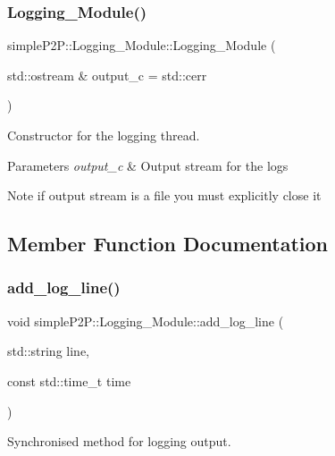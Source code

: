 \subsubsection{\texorpdfstring{Logging\+\_\+\+Module()}{Logging\_Module()}}
{\footnotesize\ttfamily simple\+P2\+P\+::\+Logging\+\_\+\+Module\+::\+Logging\+\_\+\+Module (\begin{DoxyParamCaption}\item[{std\+::ostream \&}]{output\+\_\+c = {\ttfamily std\+:\+:cerr} }\end{DoxyParamCaption})}



Constructor for the logging thread. 


\begin{DoxyParams}{Parameters}
{\em output\+\_\+c} & Output stream for the logs \\
\hline
\end{DoxyParams}
\begin{DoxyNote}{Note}
if output stream is a file you must explicitly close it 
\end{DoxyNote}


\subsection{Member Function Documentation}
\mbox{\label{classsimpleP2P_1_1Logging__Module_a5f1eb6d6c66d406f02ae4093cc7657ec}} 
\subsubsection{\texorpdfstring{add\+\_\+log\+\_\+line()}{add\_log\_line()}}
{\footnotesize\ttfamily void simple\+P2\+P\+::\+Logging\+\_\+\+Module\+::add\+\_\+log\+\_\+line (\begin{DoxyParamCaption}\item[{std\+::string}]{line,  }\item[{const std\+::time\+\_\+t}]{time }\end{DoxyParamCaption})}



Synchronised method for logging output. 


